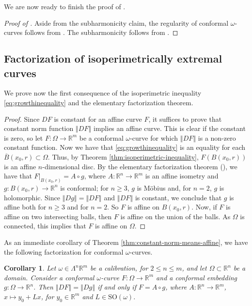 \documentclass[a4paper,leqno,11pt]{amsart}
\numberwithin{equation}{section}
\newtheorem{corollary}[theorem]{Corollary}
\theoremstyle{remark}
\theoremstyle{remark}
\newcommand{\R}{\mathbb{R}}
\newcommand{\norm}[1]{ \left\Vert #1 \right\Vert }	%
\newcommand{\SO}{\mathrm{SO}}
\begin{document}
We are now ready to finish the proof of .
\begin{proof}[Proof of ]
Aside from the subharmonicity claim, the regularity of conformal $\omega$-curves follows from . The subharmonicity follows from .
\end{proof}



\subsection{Factorization of isoperimetrically extremal curves}
\label{sec:conditional}

We prove now the first consequence of the isoperimetric inequality \eqref{eq:growthinequality} and the elementary factorization theorem.


\constantNorm*

\begin{proof}
Since $DF$ is constant for an affine curve $F$, it suffices to prove that constant norm function $\norm{DF}$ implies an affine curve. This is clear if the constant is zero, so let $F\colon \Omega \to \R^m$ be a conformal $\omega$-curve for which $\norm{DF}$ is a non-zero constant function. Now we have that \eqref{eq:growthinequality} is an equality for each $\overline{B}(x_0,r) \subset \Omega$. Thus, by Theorem \ref{thm:isoperimetric-inequality}, $F( B(x_0,r) )$ is an affine $n$-dimensional disc. By the elementary factorization theorem (), we have that $F|_{B(x_0,r)} = A \circ g$, where $A \colon \R^n \to \R^m$ is an affine isometry and $g \colon B(x_0,r) \to \R^n$ is conformal; for $n\ge 3$, $g$ is M\"obius and, for $n=2$, $g$ is holomorphic. Since $\norm{Dg} = \norm{DF}$ and $\norm{DF}$ is constant, we conclude that $g$ is affine both for $n\ge 3$ and for $n = 2$. So $F$ is affine on $B(x_0,r)$. Now, if $F$ is affine on two intersecting balls, then $F$ is affine on the union of the balls. As $\Omega$ is connected, this implies that $F$ is affine on $\Omega$.
\end{proof}

As an immediate corollary of Theorem \ref{thm:constant-norm-means-affine}, we have the following factorization for conformal $\omega$-curves.
\begin{corollary}
\label{cor:norm-Stoilow}
Let $\omega \in \Lambda^n \R^m$ be a calibration, for $2\le n \le m$, and let $\Omega \subset \R^n$ be a domain. Consider a conformal $\omega$-curve $F\colon \Omega \to \R^m$ and a conformal embedding $g \colon \Omega \to \R^n$. Then $\norm{DF} = \norm{Dg}$ if and only if $F = A \circ g$, where $A \colon \R^n \to \R^m$, $x\mapsto y_0 + Lx$, for $y_0\in \R^m$ and $L \in \SO(\omega)$.
\end{corollary}
\end{document}
